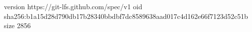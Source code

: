 version https://git-lfs.github.com/spec/v1
oid sha256:b1a15d28d790db17b28340bbdbf7dc8589638aad017c4d162e66f7123d52c51b
size 2856
